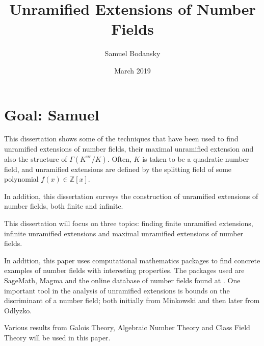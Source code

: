 \documentclass[12pt]{extarticle}
\title{Unramified Extensions of Number Fields}
\author{Samuel Bodansky}
\date{March 2019}
\newcommand{\Z}{\mathbb{Z}}
\newcommand{\<}{\langle}
\renewcommand{\>}{\rangle}
\theoremstyle{definition}
\begin{document}
\maketitle
\section{Goal: Samuel }
This dissertation shows some of the techniques that have been used to find unramified extensions of number fields,  their maximal unramified extension and also the structure of $\Gamma(K^{ur}/K)$. Often, $K$ is taken to be a quadratic number field, and unramified extensions are defined by the splitting field of some polynomial $f(x) \in \Z[x]$. \par
In addition, this dissertation surveys the construction of unramified extensions of number fields, both finite and infinite. \par
This dissertation will focus on three topics: finding finite unramified extensions, infinite unramified extensions and maximal unramified extensions of number fields. \par
In addition, this paper uses computational mathematics packages to find concrete examples of number fields with interesting properties. The packages used are SageMath, Magma and the online database of number fields found at \cite{JONE2}.
 One important tool in the analysis of unramified extensions is bounds on the discriminant of a number field; both initially from Minkowski and then later from Odlyzko. \par
 Various results from Galois Theory, Algebraic Number Theory and Class Field Theory will be used in this paper. 
\end{document}
